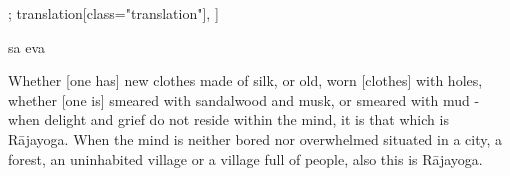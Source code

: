 \begin{alignment}[
  texts=edition[class="edition"];
  translation[class="translation"],
  ]
\begin{edition}
\begin{prose}[p18_01]
{  }
sa eva
\dd{}
\end{prose}
\end{edition}
  \begin{translation}
    \begin{tlate}[p17_02]
      \noindent
Whether [one has] new clothes made of silk, or old, worn [clothes] with holes, whether [one is] smeared with sandalwood and musk, or smeared with mud - when delight and grief do not reside within the mind, it is that which is Rājayoga. When the mind is neither bored nor overwhelmed situated in a city, a forest, an uninhabited village or a village full of people, also this is Rājayoga. 
\end{tlate}
      \label{caryayogatrans}
     \begin{tlate}[p18_01]

\end{tlate}
\end{translation}
\end{alignment}
